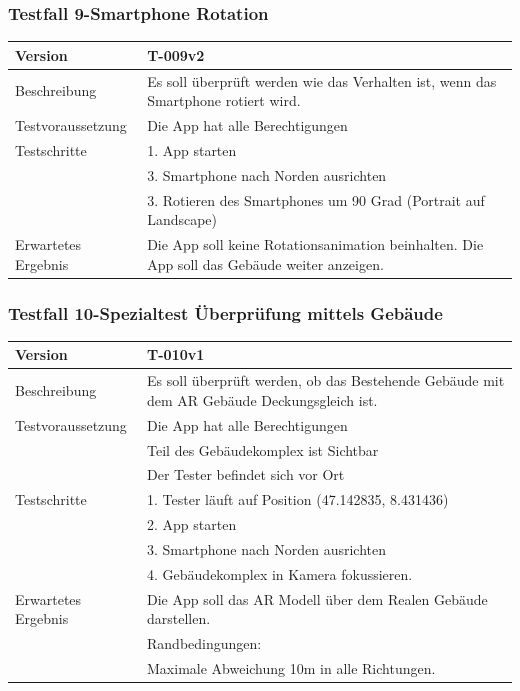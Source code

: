 \documentclass[a4paper]{scrreprt}
\begin{document}
\subsubsection{Testfall 9-Smartphone Rotation}
\begin{tabularx}{\textwidth}{|l|X|}
\hline 
	Version &
	T-009v2 \\ 
\hline 
	Beschreibung & 
	Es soll überprüft werden wie das Verhalten ist, wenn das Smartphone rotiert wird. \\ 
\hline 
	Testvoraussetzung &
	Die App hat alle Berechtigungen \\ 
\hline 
	Testschritte & 
		1. App starten \\ &
		3. Smartphone nach Norden ausrichten \\ &
		3. Rotieren des Smartphones um 90 Grad (Portrait auf Landscape) \\
\hline
	Erwartetes Ergebnis &
	Die App soll keine Rotationsanimation beinhalten. Die App soll das Gebäude weiter anzeigen. \\ 
\hline 
\end{tabularx}
\subsubsection{Testfall 10-Spezialtest Überprüfung mittels Gebäude}
\begin{tabularx}{\textwidth}{|l|X|}
\hline 
	Version &
	T-010v1 \\ 
\hline 
	Beschreibung & 
	Es soll überprüft werden, ob das Bestehende Gebäude mit dem AR Gebäude Deckungsgleich ist.\\ 
\hline 
	Testvoraussetzung &
	Die App hat alle Berechtigungen \\ &
	Teil des Gebäudekomplex ist Sichtbar\\ &
	Der Tester befindet sich vor Ort\\ 
\hline 
	Testschritte & 
		1. Tester läuft auf Position (47.142835, 8.431436) \\ &
		2. App starten \\ &
		3. Smartphone nach Norden ausrichten \\ &
		4. Gebäudekomplex in Kamera fokussieren. \\
\hline
	Erwartetes Ergebnis &
	Die App soll das AR Modell über dem Realen Gebäude darstellen. \\ &
	Randbedingungen: \\ &
		Maximale Abweichung 10m in alle Richtungen.\\ 
\hline 
\end{tabularx}
\end{document}
